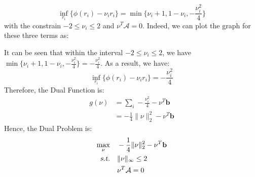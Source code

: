 \documentclass[10pt,a4paper]{article}
\begin{document}
\begin{equation*}
	\displaystyle\inf_{r_{i}}\{ \phi(r_{i}) - \nu_{i} r_{i} \} = \displaystyle\min \{ \nu_{i} + 1, 1 - \nu_{i}, -\frac{\nu_{i}^{2}}{4} \}
\end{equation*}
with the constrain $-2 \leq \nu_{i} \leq 2$ and $\nu^{T} \mathcal{A} = 0$. Indeed, we can plot the graph for these three terms as:
\begin{center}
\end{center}
It can be seen that within the interval $-2 \leq \nu_{i} \leq 2$, we have $\displaystyle\min \{ \nu_{i} + 1, 1 - \nu_{i}, -\frac{\nu_{i}^{2}}{4} \} = - \frac{\nu_{i}^{2}}{4}$. As a result, we have:
\begin{equation*}
	\displaystyle\inf_{r_{i}}\{ \phi(r_{i}) - \nu_{i} r_{i} \} = - \frac{\nu_{i}^{2}}{4}
\end{equation*}
Therefore, the Dual Function is:
\begin{equation*}
	\begin{aligned}
	g(\nu) &= \displaystyle\sum_{i} - \frac{\nu_{i}^{2}}{4} - \nu^{T} \mathbf{b} \\
	&= -\frac{1}{4} \| \nu \|_{2}^{2} - \nu^{T} \mathbf{b}
	\end{aligned}
\end{equation*}
Hence, the Dual Problem is:
\begin{equation*}
	\begin{aligned}
		\displaystyle\max_{\nu} \quad & -\frac{1}{4} \| \nu \|_{2}^{2} - \nu^{T} \mathbf{b} \\
		\textsl{s.t.} \quad & \| \nu \|_{\infty} \leq 2 \\
		& \nu^{T} \mathcal{A} = 0
	\end{aligned}
\end{equation*}
\end{document}
